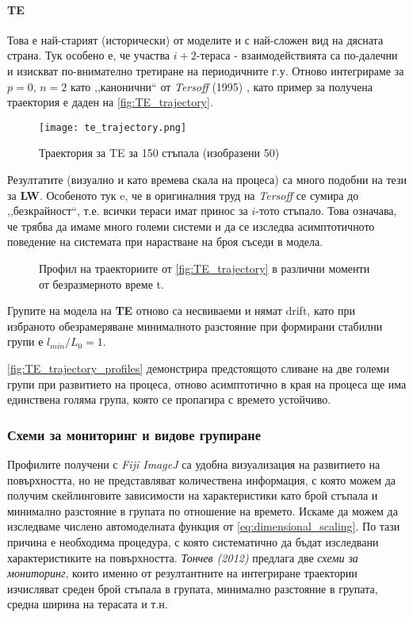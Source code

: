 \paragraph{TE} Това е най-старият (исторически) от моделите и с най-сложен вид на дясната страна. Тук особено е, че участва $i+2$-тераса - взаимодействията са по-далечни и изискват по-внимателно третиране на периодичните г.у. Отново интегрираме за $p = 0$, $n = 2$ като ,,канонични`` от \textit{Tersoff} (1995) \cite{Tersoff1995}, като пример за получена траектория е даден на \autoref{fig:TE_trajectory}.
\begin{figure}[htbp]
	\centering
	\texttt{[image: te\_trajectory.png]}
	\caption{Траектория за TE за 150 стъпала (изобразени 50)}
	\label{fig:TE_trajectory}
\end{figure}
Резултатите (визуално и като времева скала на процеса) са много подобни на тези за \textbf{LW}. Особеното тук e, че в оригиналния труд на \textit{Tersoff} се сумира до ,,безкрайност``, т.е. всички тераси имат принос за $i$-тото стъпало. Това означава, че трябва да имаме много големи системи и да се изследва асимптотичното поведение на системата при нарастване на броя съседи в модела.
\begin{figure}[hbpt]
    \centering
    \caption{Профил на траекториите от \autoref{fig:TE_trajectory} в различни моменти от безразмерното време t.}
    \label{fig:TE_trajectory_profiles}
\end{figure}
Групите на модела на \textbf{TE} отново са несвиваеми и нямат drift, като при избраното обезрамеряване минималното разстояние при формирани стабилни групи е $l_{min}/L_{0} = 1$. 

\autoref{fig:TE_trajectory_profiles} демонстрира предстоящото сливане на две големи групи при развитието на процеса, отново асимптотично в края на процеса ще има единствена голяма група, която се пропагира с времето устойчиво.

\subsubsection{Схеми за мониторинг и видове групиране}
Профилите получени с \textit{Fiji ImageJ} са удобна визуализация на развитието на повърхността, но не представляват количествена информация, с която можем да получим скейлинговите зависимости на характеристики като брой стъпала и минимално разстояние в групата по отношение на времето. Искаме да можем да изследваме числено автомоделната функция от \autoref{eq:dimensional_scaling}. По тази причина е необходима процедура, с която систематично да бъдат изследвани характеристиките на повърхността. \textit{Тончев (2012)} \cite{TonchevArxiv2012} предлага две \textit{схеми за мониторинг}, които именно от резултантните на интегриране траектории изчисляват среден брой стъпала в групата, минимално разстояние в групата, средна ширина на терасата и т.н. 

